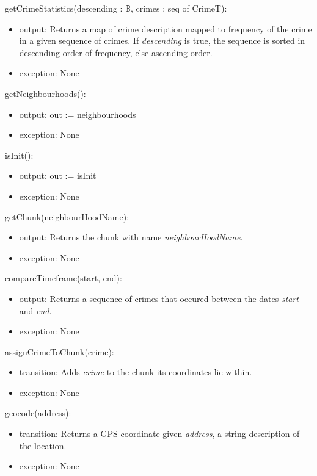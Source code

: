 \documentclass[12pt]{article}
\begin{document}
\noindent getCrimeStatistics(descending : $\mathbb{B}$, crimes : seq of CrimeT):
\begin{itemize}
\item output: \textnormal{\small{Returns a map of crime description mapped to frequency of the crime in a given sequence of crimes. If \textit{descending} is true, the sequence is sorted in descending order of frequency, else ascending order. }}
\item exception: None
\end{itemize}

\noindent getNeighbourhoods():
\begin{itemize}
\item output: out := neighbourhoods
\item exception: None
\end{itemize}

\noindent isInit():
\begin{itemize}
\item output: out := isInit
\item exception: None
\end{itemize}

\noindent getChunk(neighbourHoodName):
\begin{itemize}
\item output: \textnormal{\small{Returns the chunk with name \textit{neighbourHoodName}.}}
\item exception: None
\end{itemize}

\noindent compareTimeframe(start, end):
\begin{itemize}
\item output: \textnormal{\small{Returns a sequence of crimes that occured between the dates \textit{start} and \textit{end}.}}
\item exception: None
\end{itemize}

\noindent assignCrimeToChunk(crime):
\begin{itemize}
\item transition: \textnormal{\small{Adds \textit{crime} to the chunk its coordinates lie within.}}
\item exception: None
\end{itemize}

\noindent geocode(address):
\begin{itemize}
\item transition: \textnormal{\small{Returns a GPS coordinate given \textit{address}, a string description of the location.}}
\item exception: None
\end{itemize}
\end{document}
